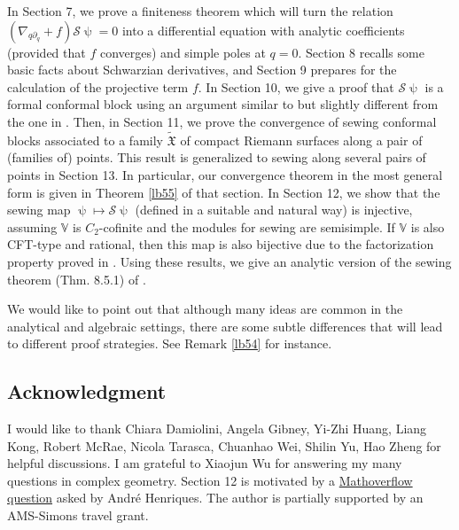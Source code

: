 \documentclass[12pt,a4paper,notitlepage]{article}
\theoremstyle{definition}
\theoremstyle{plain}
\newcommand{\fk}{\mathfrak}
\newcommand{\mc}{\mathcal}
\newcommand{\wtd}{\widetilde}
\newcommand{\Vbb}{\mathbb V}
\numberwithin{equation}{section}
\begin{document}
In Section 7, we prove a finiteness theorem which will turn the relation $(\nabla_{q\partial_q}+f)\mc S\uppsi=0$ into a differential equation with analytic coefficients (provided that $f$ converges) and simple poles at $q=0$. Section 8 recalls some basic facts about Schwarzian derivatives, and Section 9 prepares for the calculation of the projective term $f$. In Section 10, we give a proof that $\mc S\uppsi$ is a formal conformal block using an argument similar to but slightly different from the one in \cite{DGT19b}. Then, in Section 11,  we prove the convergence of sewing conformal blocks associated to a family $\wtd{\fk X}$ of compact Riemann surfaces along a pair of (families of) points. This result is generalized to sewing along several pairs of points in Section 13. In particular, our convergence theorem in the most general form is given in Theorem \ref{lb55} of that section. In Section 12, we show that the sewing map $\uppsi\mapsto\mc S\uppsi$ (defined in a suitable and natural way) is injective, assuming $\Vbb$ is $C_2$-cofinite and the modules for sewing are semisimple.  If $\Vbb$ is also CFT-type and rational, then this map is also bijective due to the factorization property proved in \cite{DGT19b}.  Using these results, we give an analytic version of the sewing theorem (Thm. 8.5.1) of \cite{DGT19b}.



We would like to point out that although many ideas are common in the analytical and algebraic settings, there are some subtle differences that will lead to different proof strategies. See Remark \ref{lb54} for instance. 







\subsection*{Acknowledgment}

I would like to thank Chiara Damiolini, Angela Gibney, Yi-Zhi Huang, Liang Kong, Robert McRae, Nicola Tarasca, Chuanhao Wei, Shilin Yu, Hao Zheng for helpful discussions. I am grateful to Xiaojun Wu for answering my many questions in complex geometry. Section 12 is motivated by a  \href{https://mathoverflow.net/questions/300460/linear-independence-of-genus-one-correlation-functions/321362#321362}{Mathoverflow question}  asked by Andr\'e Henriques. The author is partially supported by an AMS-Simons travel grant.
\end{document}
